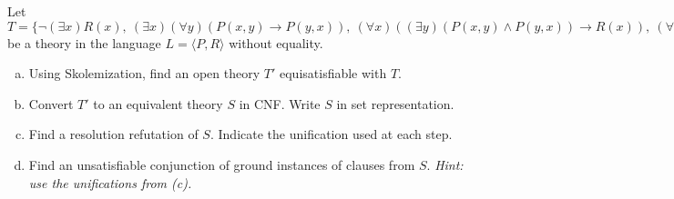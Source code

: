 \begin{problem}

    Let $T=\{\neg(\exists x) R(x),\ (\exists x)(\forall y)(P(x,y)\to P(y,x)),\ (\forall x)((\exists y)(P(x,y)\wedge P(y,x))\to R(x)),\ (\forall x)(\exists y)P(x,y)\}$ be a theory in the language $L=\langle P,R\rangle$ without equality.

    \begin{enumerate}[(a)]
        \item Using Skolemization, find an open theory $T'$ equisatisfiable with $T$.
        \item Convert $T'$ to an equivalent theory $S$ in CNF. Write $S$ in set representation.
        \item Find a resolution refutation of $S$. Indicate the unification used at each step.
        \item Find an unsatisfiable conjunction of ground instances of clauses from $S$. {\it Hint: use the unifications from (c).}       
    \end{enumerate}

    \begin{solution}
        

\end{solution}
\end{problem}
